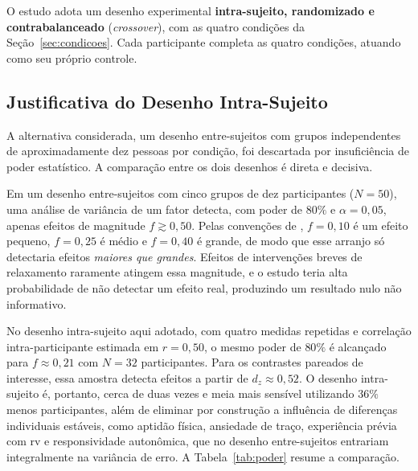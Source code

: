 O estudo adota um desenho experimental \textbf{intra-sujeito, randomizado e contrabalanceado} (\textit{crossover}), com as quatro condições da Seção~\ref{sec:condicoes}. Cada participante completa as quatro condições, atuando como seu próprio controle.

\subsection{Justificativa do Desenho Intra-Sujeito}\label{subsec:justificativa-desenho}

A alternativa considerada, um desenho entre-sujeitos com grupos independentes de aproximadamente dez pessoas por condição, foi descartada por insuficiência de poder estatístico. A comparação entre os dois desenhos é direta e decisiva.

Em um desenho entre-sujeitos com cinco grupos de dez participantes ($N = 50$), uma análise de variância de um fator detecta, com poder de $80\%$ e $\alpha = 0{,}05$, apenas efeitos de magnitude $f \gtrsim 0{,}50$. Pelas convenções de \citet{Cohen1988}, $f = 0{,}10$ é um efeito pequeno, $f = 0{,}25$ é médio e $f = 0{,}40$ é grande, de modo que esse arranjo só detectaria efeitos \emph{maiores que grandes}. Efeitos de intervenções breves de relaxamento raramente atingem essa magnitude, e o estudo teria alta probabilidade de não detectar um efeito real, produzindo um resultado nulo não informativo.

No desenho intra-sujeito aqui adotado, com quatro medidas repetidas e correlação intra-participante estimada em $r = 0{,}50$, o mesmo poder de $80\%$ é alcançado para $f \approx 0{,}21$ com $N = 32$ participantes. Para os contrastes pareados de interesse, essa amostra detecta efeitos a partir de $d_z \approx 0{,}52$. O desenho intra-sujeito é, portanto, cerca de duas vezes e meia mais sensível utilizando $36\%$ menos participantes, além de eliminar por construção a influência de diferenças individuais estáveis, como aptidão física, ansiedade de traço, experiência prévia com \gls{rv} e responsividade autonômica, que no desenho entre-sujeitos entrariam integralmente na variância de erro. A Tabela~\ref{tab:poder} resume a comparação.


